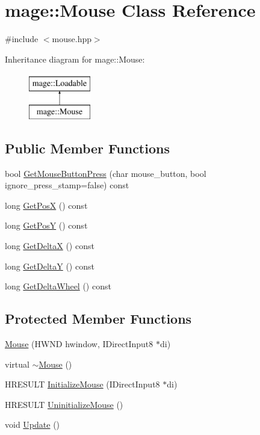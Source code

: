 \hypertarget{classmage_1_1_mouse}{}\section{mage\+:\+:Mouse Class Reference}
\label{classmage_1_1_mouse}


{\ttfamily \#include $<$mouse.\+hpp$>$}

Inheritance diagram for mage\+:\+:Mouse\+:\begin{figure}[H]
\begin{center}
\leavevmode
\includegraphics[height=2.000000cm]{classmage_1_1_mouse}
\end{center}
\end{figure}
\subsection*{Public Member Functions}
\begin{DoxyCompactItemize}
\item 
bool \hyperlink{classmage_1_1_mouse_a9c8d4493c86685b259819b5995a17c7a}{Get\+Mouse\+Button\+Press} (char mouse\+\_\+button, bool ignore\+\_\+press\+\_\+stamp=false) const
\item 
long \hyperlink{classmage_1_1_mouse_a6af2e1ea96554ee34e16a37a257fe11c}{Get\+PosX} () const
\item 
long \hyperlink{classmage_1_1_mouse_af4da58c811896f0814956382a756db61}{Get\+PosY} () const
\item 
long \hyperlink{classmage_1_1_mouse_a137313b065314d98c7b61eaefce6c3d1}{Get\+DeltaX} () const
\item 
long \hyperlink{classmage_1_1_mouse_af0769d0f7658b0699cf5b4f797163510}{Get\+DeltaY} () const
\item 
long \hyperlink{classmage_1_1_mouse_a898f4d0e645040c3a4121c2fe8119a89}{Get\+Delta\+Wheel} () const
\end{DoxyCompactItemize}
\subsection*{Protected Member Functions}
\begin{DoxyCompactItemize}
\item 
\hyperlink{classmage_1_1_mouse_ad02365977dab44603400ac6f24e0df97}{Mouse} (H\+W\+ND hwindow, I\+Direct\+Input8 $\ast$di)
\item 
virtual \hyperlink{classmage_1_1_mouse_a855f1075ae774c8417d3da7a1e02d580}{$\sim$\+Mouse} ()
\item 
H\+R\+E\+S\+U\+LT \hyperlink{classmage_1_1_mouse_a5789b777aca438fb343a515165cd907a}{Initialize\+Mouse} (I\+Direct\+Input8 $\ast$di)
\item 
H\+R\+E\+S\+U\+LT \hyperlink{classmage_1_1_mouse_a3f4647121d283a95464a0652da2816b0}{Uninitialize\+Mouse} ()
\item 
void \hyperlink{classmage_1_1_mouse_a0cddae3f871dd69c1ba6928dc6b1f985}{Update} ()
\end{DoxyCompactItemize}
